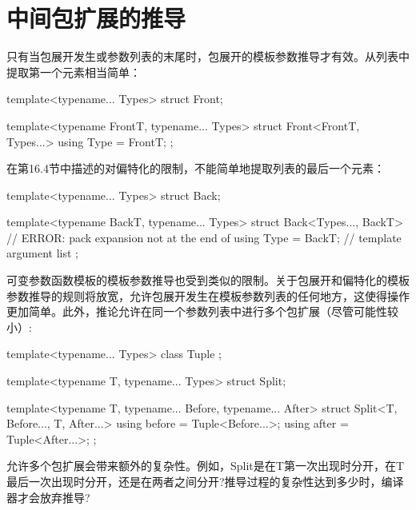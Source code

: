 \section{中间包扩展的推导}
只有当包展开发生或参数列表的末尾时，包展开的模板参数推导才有效。从列表中提取第一个元素相当简单：

\begin{cpp}
template<typename... Types>
struct Front;

template<typename FrontT, typename... Types>
struct Front<FrontT, Types...> {
	using Type = FrontT;
};
\end{cpp}

在第16.4节中描述的对偏特化的限制，不能简单地提取列表的最后一个元素：

\begin{cpp}
template<typename... Types>
struct Back;

template<typename BackT, typename... Types>
struct Back<Types..., BackT> { // ERROR: pack expansion not at the end of
	using Type = BackT; // template argument list
};
\end{cpp}

可变参数函数模板的模板参数推导也受到类似的限制。关于包展开和偏特化的模板参数推导的规则将放宽，允许包展开发生在模板参数列表的任何地方，这使得操作更加简单。此外，推论允许在同一个参数列表中进行多个包扩展（尽管可能性较小）:

\begin{cpp}
template<typename... Types> class Tuple {};

template<typename T, typename... Types>
struct Split;

template<typename T, typename... Before, typename... After>
struct Split<T, Before..., T, After...> {
	using before = Tuple<Before...>;
	using after = Tuple<After...>;
};
\end{cpp}

允许多个包扩展会带来额外的复杂性。例如，Split是在T第一次出现时分开，在T最后一次出现时分开，还是在两者之间分开?推导过程的复杂性达到多少时，编译器才会放弃推导?













































